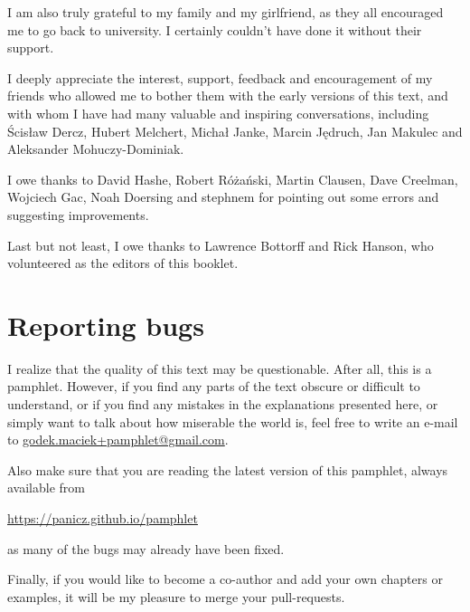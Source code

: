 I am also truly grateful to my family and my girlfriend,
as they all encouraged me to go back to university. I certainly
couldn't have done it without their support.

I deeply appreciate the interest, support, feedback and
encouragement of my friends who allowed me to bother them with
the early versions of this text, and with whom I have had many
valuable and inspiring conversations, including Ścisław Dercz,
Hubert Melchert, Michał Janke, Marcin Jędruch, Jan Makulec
and Aleksander Mohuczy-Dominiak. 

I owe thanks to David Hashe, Robert Różański, Martin Clausen,
Dave Creelman, Wojciech Gac, Noah Doersing and stephnem for pointing
out some errors and suggesting improvements.

Last but not least, I owe thanks to Lawrence Bottorff and Rick Hanson,
who volunteered as the editors of this booklet.

\section*{Reporting bugs}

I realize that the quality of this text may be questionable.
After all, this is a pamphlet. However, if you find any parts
of the text obscure or difficult to understand, or if you
find any mistakes in the explanations presented here, or
simply want to talk about how miserable the world is, feel
free to write an e-mail to
\href{mailto:godek.maciek+pamphlet@gmail.com}{godek.maciek+pamphlet@gmail.com}.

Also make sure that you are reading the latest version
of this pamphlet, always available from

\url{https://panicz.github.io/pamphlet}

\noindent as many of the bugs may already have been fixed.

Finally, if you would like to become a co-author and add your
own chapters or examples, it will be my pleasure to merge your
pull-requests.
